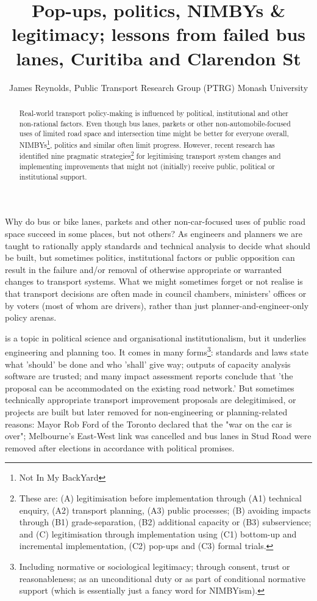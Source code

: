 \documentclass{tufte-handout}
\title{Pop-ups, politics,  NIMBYs \& legitimacy; lessons from failed bus lanes, Curitiba and Clarendon St}
\author{James Reynolds, Public Transport Research Group (PTRG) Monash University}
\begin{document}
\maketitle%

\begin{abstract}
\noindent
Real-world transport policy-making is influenced by political, institutional and other non-rational factors\cite{Marsden:2017aa}. Even though bus lanes, parkets or other non-automobile-focused uses of limited road space and intersection time might be better for everyone overall, NIMBYs\footnote{Not In My BackYard}, politics and similar often limit progress.  However, recent research\cite{Reynolds:2020aa} has identified nine pragmatic strategies\footnote{These are: (A) legitimisation before implementation through (A1) technical enquiry, (A2) transport planning, (A3) public processes; (B) avoiding impacts through (B1) grade-separation, (B2) additional capacity or (B3) subservience; and (C) legitimisation through implementation using (C1) bottom-up and incremental implementation, (C2) pop-ups and (C3) formal trials.} for legitimising transport system changes and implementing improvements that might not (initially) receive public, political or institutional support.   
\end{abstract}


Why do bus or bike lanes, parkets and other non-car-focused uses of public road space succeed in some places, but not others? As engineers and planners we are taught to rationally apply standards and technical analysis to decide what should be built, but sometimes politics, institutional factors or public opposition can result in the failure and/or removal of otherwise appropriate or warranted changes to transport systems. What we might sometimes forget or not realise is that transport decisions are often made in council chambers, ministers' offices or by voters (most of whom are drivers), rather than just planner-and-engineer-only policy arenas.  

 is a topic in political science and organisational institutionalism, but it underlies engineering and planning too.  It comes in many forms\footnote{Including normative or sociological legitimacy; through consent, trust or reasonableness; as an unconditional duty or as part of conditional normative support (which is essentially just a fancy word for NIMBYism).}: standards and laws state what 'should' be done and who 'shall' give way;  outputs of capacity analysis software are trusted; and many impact assessment reports conclude that 'the proposal can be  accommodated on the existing road network.'  But sometimes technically appropriate transport improvement proposals are delegitimised, or projects are built but later removed for non-engineering or planning-related reasons: Mayor Rob Ford of the Toronto declared that the "war on the car is over"; Melbourne's East-West link was cancelled and bus lanes in Stud Road were removed after elections in accordance with political promises.  
\end{document}
